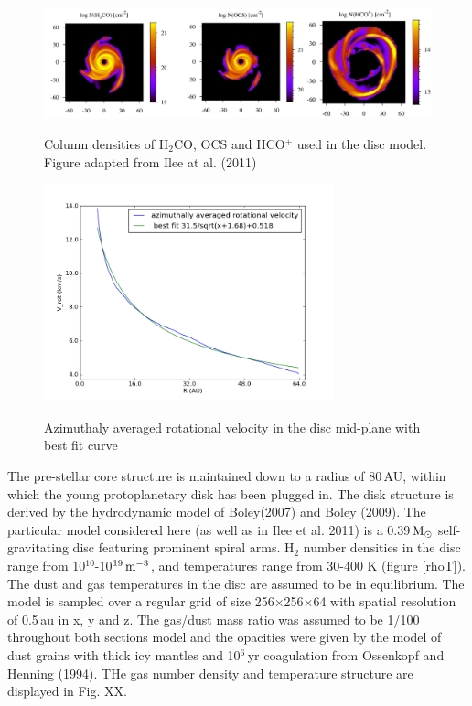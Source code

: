 \documentclass[useAMS,usenatbib]{mn2e}
\begin{document}
\begin{figure}
 \includegraphics[width=168mm]{Figures/model/columnDensities2.png}
 \label{Chemistry} 
 \caption{Column densities of H$_2$CO, OCS and HCO$^+$ used in the disc model. Figure adapted from Ilee at al. (2011)}
\end{figure}

\begin{figure}
 \includegraphics[width=84mm]{Figures/model/rotational_velocities.png}
 \label{velocity}
 \caption{Azimuthaly averaged rotational velocity in the disc mid-plane with best fit curve}
\end{figure}


The pre-stellar core structure is maintained down to a radius of 80\,AU, within which the young protoplanetary disk has been plugged in. The disk structure is derived by the hydrodynamic model of Boley(2007) and Boley (2009). The particular model considered here (as well as in Ilee et al. 2011) is a 0.39$\,\rm{M}_\odot$ self-gravitating disc featuring prominent spiral arms. H$_2$ number densities in the disc range from 10$^{10}$-10$^{19}\,\rm{m}^{-3}$, and temperatures range from 30-400 K (figure \ref{rhoT}). The dust and gas temperatures in the disc are assumed to be in equilibrium. The model is sampled over a regular grid of size 256$\times$256$\times$64 with spatial resolution of 0.5$\,$au in x, y and z. The gas/dust mass ratio was assumed to be 1/100 throughout both sections model and the opacities were given by the model of dust grains with thick icy mantles and 10$^6\,$yr coagulation from Ossenkopf and Henning (1994). THe gas number density and temperature structure are displayed in Fig. XX. \newline
\end{document}
